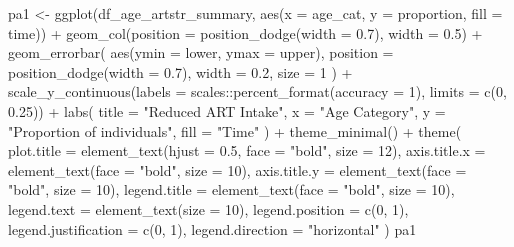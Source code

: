 \documentclass[
  letterpaper,
  DIV=11,
  numbers=noendperiod]{scrartcl}
\newenvironment{Shaded}{\begin{snugshade}}{\end{snugshade}}
\newcommand{\AttributeTok}[1]{\textcolor[rgb]{0.40,0.45,0.13}{#1}}
\newcommand{\DecValTok}[1]{\textcolor[rgb]{0.68,0.00,0.00}{#1}}
\newcommand{\FloatTok}[1]{\textcolor[rgb]{0.68,0.00,0.00}{#1}}
\newcommand{\FunctionTok}[1]{\textcolor[rgb]{0.28,0.35,0.67}{#1}}
\newcommand{\NormalTok}[1]{\textcolor[rgb]{0.00,0.23,0.31}{#1}}
\newcommand{\OtherTok}[1]{\textcolor[rgb]{0.00,0.23,0.31}{#1}}
\newcommand{\SpecialCharTok}[1]{\textcolor[rgb]{0.37,0.37,0.37}{#1}}
\newcommand{\StringTok}[1]{\textcolor[rgb]{0.13,0.47,0.30}{#1}}
\begin{document}
\begin{Shaded}
\begin{Highlighting}[]
\NormalTok{pa1 }\OtherTok{\textless{}{-}} \FunctionTok{ggplot}\NormalTok{(df\_age\_artstr\_summary, }\FunctionTok{aes}\NormalTok{(}\AttributeTok{x =}\NormalTok{ age\_cat, }\AttributeTok{y =}\NormalTok{ proportion, }\AttributeTok{fill =}\NormalTok{ time)) }\SpecialCharTok{+}
  \FunctionTok{geom\_col}\NormalTok{(}\AttributeTok{position =} \FunctionTok{position\_dodge}\NormalTok{(}\AttributeTok{width =} \FloatTok{0.7}\NormalTok{), }\AttributeTok{width =} \FloatTok{0.5}\NormalTok{) }\SpecialCharTok{+}
  \FunctionTok{geom\_errorbar}\NormalTok{(}
    \FunctionTok{aes}\NormalTok{(}\AttributeTok{ymin =}\NormalTok{ lower, }\AttributeTok{ymax =}\NormalTok{ upper),}
    \AttributeTok{position =} \FunctionTok{position\_dodge}\NormalTok{(}\AttributeTok{width =} \FloatTok{0.7}\NormalTok{),}
    \AttributeTok{width =} \FloatTok{0.2}\NormalTok{,}
    \AttributeTok{size =} \DecValTok{1}
\NormalTok{  ) }\SpecialCharTok{+}
  \FunctionTok{scale\_y\_continuous}\NormalTok{(}\AttributeTok{labels =}\NormalTok{ scales}\SpecialCharTok{::}\FunctionTok{percent\_format}\NormalTok{(}\AttributeTok{accuracy =} \DecValTok{1}\NormalTok{), }\AttributeTok{limits =} \FunctionTok{c}\NormalTok{(}\DecValTok{0}\NormalTok{, }\FloatTok{0.25}\NormalTok{)) }\SpecialCharTok{+}
  \FunctionTok{labs}\NormalTok{(}
    \AttributeTok{title =} \StringTok{"Reduced ART Intake"}\NormalTok{,}
    \AttributeTok{x =} \StringTok{"Age Category"}\NormalTok{,}
    \AttributeTok{y =} \StringTok{"Proportion of individuals"}\NormalTok{,}
    \AttributeTok{fill =} \StringTok{"Time"}
\NormalTok{  ) }\SpecialCharTok{+}
  \FunctionTok{theme\_minimal}\NormalTok{() }\SpecialCharTok{+}
  \FunctionTok{theme}\NormalTok{(}
    \AttributeTok{plot.title =} \FunctionTok{element\_text}\NormalTok{(}\AttributeTok{hjust =} \FloatTok{0.5}\NormalTok{, }\AttributeTok{face =} \StringTok{"bold"}\NormalTok{, }\AttributeTok{size =} \DecValTok{12}\NormalTok{),}
    \AttributeTok{axis.title.x =} \FunctionTok{element\_text}\NormalTok{(}\AttributeTok{face =} \StringTok{"bold"}\NormalTok{, }\AttributeTok{size =} \DecValTok{10}\NormalTok{),}
    \AttributeTok{axis.title.y =} \FunctionTok{element\_text}\NormalTok{(}\AttributeTok{face =} \StringTok{"bold"}\NormalTok{, }\AttributeTok{size =} \DecValTok{10}\NormalTok{),}
    \AttributeTok{legend.title =} \FunctionTok{element\_text}\NormalTok{(}\AttributeTok{face =} \StringTok{"bold"}\NormalTok{, }\AttributeTok{size =} \DecValTok{10}\NormalTok{),}
    \AttributeTok{legend.text =} \FunctionTok{element\_text}\NormalTok{(}\AttributeTok{size =} \DecValTok{10}\NormalTok{),}
    \AttributeTok{legend.position =} \FunctionTok{c}\NormalTok{(}\DecValTok{0}\NormalTok{, }\DecValTok{1}\NormalTok{),}
    \AttributeTok{legend.justification =} \FunctionTok{c}\NormalTok{(}\DecValTok{0}\NormalTok{, }\DecValTok{1}\NormalTok{),}
    \AttributeTok{legend.direction =} \StringTok{"horizontal"}
\NormalTok{  )}
\NormalTok{pa1}
\end{Highlighting}
\end{Shaded}
\end{document}
